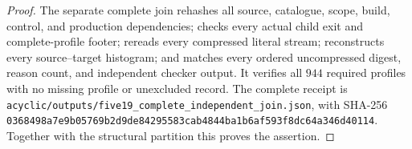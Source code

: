 \begin{proof}
The separate complete join rehashes all source, catalogue, scope, build,
control, and production dependencies; checks every actual child exit
and complete-profile footer; rereads every compressed literal stream;
reconstructs every source--target histogram; and matches every ordered
uncompressed digest, reason count, and independent checker output.
It verifies all $944$ required profiles with no missing profile or
unexcluded record. The complete receipt is
\texttt{acyclic/outputs/five19\_complete\_independent\_join.json},
with SHA-256
\texttt{0368498a7e9b05769b2d9de84295583cab4844ba1b6af593f8dc64a346d40114}.
Together with the structural partition this proves the assertion.
\end{proof}
